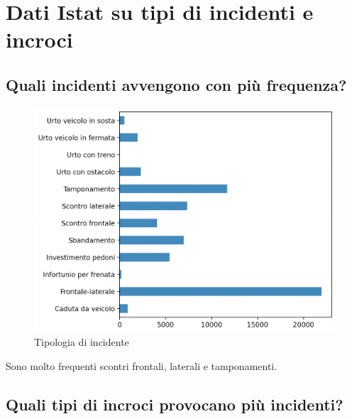 \documentclass[a4paper]{report}
\begin{document}

\section{Dati Istat su tipi di incidenti e incroci}

\subsection{Quali incidenti avvengono con più frequenza?}

\begin{figure}
    \includegraphics[width=\linewidth]{../src/incidenti/incidenti_senza_coords/localizzazione_incidente/tipo_incidente.png}
    \caption{Tipologia di incidente}
    \label{fig:tipo_incidente}
\end{figure}

Sono molto frequenti scontri frontali, laterali e tamponamenti.

\subsection{Quali tipi di incroci provocano più incidenti?}
\end{document}
